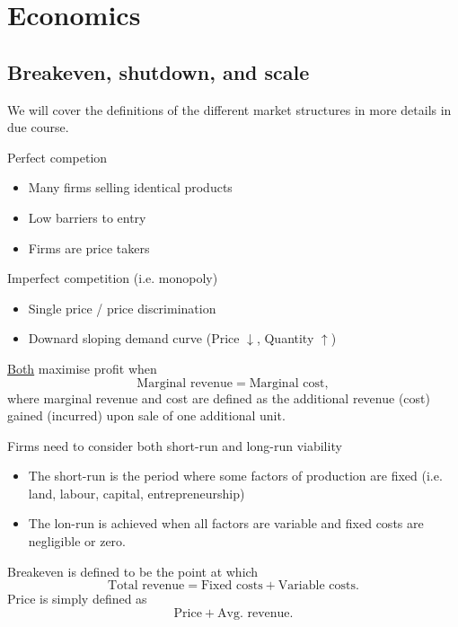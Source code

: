 \documentclass[../notes_compiled.tex]{subfiles}
\begin{document}
\section{Economics}

\subsection{Breakeven, shutdown, and scale}
\begin{itemize}
{\color{red}
\item[Note:] We will cover the definitions of the different market structures in more details in due course.
}
\item Perfect competion
\begin{itemize}
\item Many firms selling identical products
\item Low barriers to entry
\item Firms are price takers
\end{itemize}
\item Imperfect competition (i.e. monopoly)
\begin{itemize}
\item Single price / price discrimination
\item Downard sloping demand curve (Price $\downarrow$, Quantity $\uparrow$)
\end{itemize}
\item \underline{Both} maximise profit when
\begin{equation}
\text{Marginal revenue} = \text{Marginal cost},
\end{equation}
where marginal revenue and cost are defined as the additional revenue (cost) gained (incurred) upon sale of one additional unit.

\item Firms need to consider both short-run and long-run viability
\begin{itemize}
\item The short-run is the period where some factors of production are fixed (i.e. land, labour, capital, entrepreneurship)
\item The lon-run is achieved when all factors are variable and fixed costs are negligible or zero.
\end{itemize}

\item Breakeven is defined to be the point at which
\begin{equation}
\text{Total revenue} = \text{Fixed costs} + \text{Variable costs}.
\end{equation}
Price is simply defined as
\begin{equation}
\text{Price} + \text{Avg. revenue}.
\end{equation}


\end{itemize}
\end{document}
